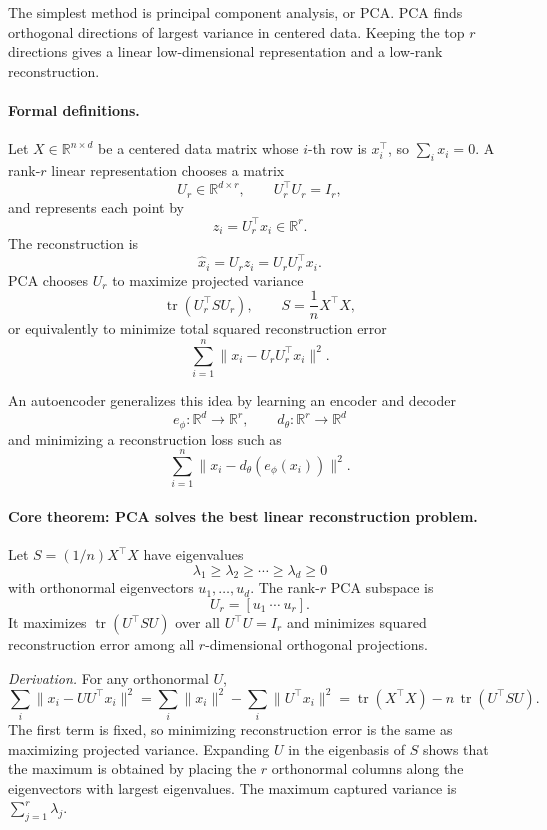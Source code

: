 The simplest method is principal component analysis, or PCA. PCA finds orthogonal directions of largest variance in centered data. Keeping the top \(r\) directions gives a linear low-dimensional representation and a low-rank reconstruction.

\paragraph{Formal definitions.}
Let \(X\in\mathbb R^{n\times d}\) be a centered data matrix whose \(i\)-th row is \(x_i^\top\), so \(\sum_i x_i=0\). A rank-\(r\) linear representation chooses a matrix
\[
U_r\in\mathbb R^{d\times r},\qquad U_r^\top U_r=I_r,
\]
and represents each point by
\[
z_i=U_r^\top x_i\in\mathbb R^r.
\]
The reconstruction is
\[
\widehat x_i=U_r z_i=U_rU_r^\top x_i.
\]
PCA chooses \(U_r\) to maximize projected variance
\[
\operatorname{tr}(U_r^\top S U_r),
\qquad
S=\frac1n X^\top X,
\]
or equivalently to minimize total squared reconstruction error
\[
\sum_{i=1}^n \|x_i-U_rU_r^\top x_i\|^2.
\]

An autoencoder generalizes this idea by learning an encoder and decoder
\[
e_\phi:\mathbb R^d\to\mathbb R^r,\qquad d_\theta:\mathbb R^r\to\mathbb R^d
\]
and minimizing a reconstruction loss such as
\[
\sum_{i=1}^n \|x_i-d_\theta(e_\phi(x_i))\|^2.
\]

\paragraph{Core theorem: PCA solves the best linear reconstruction problem.}
Let \(S=(1/n)X^\top X\) have eigenvalues
\[
\lambda_1\geq\lambda_2\geq\cdots\geq\lambda_d\geq0
\]
with orthonormal eigenvectors \(u_1,\ldots,u_d\). The rank-\(r\) PCA subspace is
\[
U_r=[u_1\ \cdots\ u_r].
\]
It maximizes \(\operatorname{tr}(U^\top S U)\) over all \(U^\top U=I_r\) and minimizes squared reconstruction error among all \(r\)-dimensional orthogonal projections.

\emph{Derivation.} For any orthonormal \(U\),
\[
\sum_i \|x_i-UU^\top x_i\|^2
=\sum_i \|x_i\|^2-\sum_i \|U^\top x_i\|^2
=\operatorname{tr}(X^\top X)-n\,\operatorname{tr}(U^\top S U).
\]
The first term is fixed, so minimizing reconstruction error is the same as maximizing projected variance. Expanding \(U\) in the eigenbasis of \(S\) shows that the maximum is obtained by placing the \(r\) orthonormal columns along the eigenvectors with largest eigenvalues. The maximum captured variance is \(\sum_{j=1}^r\lambda_j\).


